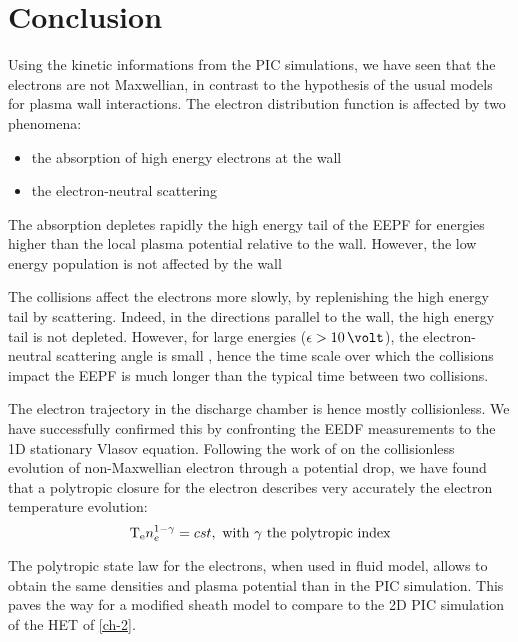 
\section{Conclusion }
\label{sec-ch3conclusion}

Using the kinetic informations from the \ac{PIC} simulations, we have seen that the electrons are not Maxwellian, in contrast to the hypothesis of the usual models for plasma wall interactions.
The electron distribution function is affected by two phenomena\string:
\begin{itemize}
  \item the absorption of high energy electrons at the wall
  \item the electron-neutral scattering
\end{itemize}
\vspace{1em}
The absorption depletes rapidly the high energy tail of the EEPF for energies higher than the local plasma potential relative to the wall.
However, the low energy population is not affected by the wall

The collisions affect the electrons more slowly, by replenishing the high energy tail by scattering.
Indeed, in the directions parallel to the wall, the high energy tail is not depleted.
However, for large energies ($\ek > 10\,\volt$), the electron-neutral scattering angle is small \citep{vahedi1995}, hence the time scale over which the collisions impact the EEPF is much longer than the typical time between two collisions.

The electron trajectory in the discharge chamber is hence mostly collisionless.
We have successfully confirmed this by confronting the EEDF measurements to the 1D stationary Vlasov equation.
Following the work of \citet{zhang2016} on the collisionless evolution of non-Maxwellian electron through a potential drop, we have found that a polytropic closure for the electron describes very accurately the electron temperature evolution\string:
\begin{equation*} \label{eq-polyp2}
  \mathrm{T_e} n_e^{1-\gamma} = cst, \text{ with $\gamma$ the polytropic index}
\end{equation*}

The polytropic state law for the electrons, when used in fluid model, allows to obtain the same densities and plasma potential than in the \ac{PIC} simulation.
This paves the way for a modified sheath model to compare to the \ac{2D} \ac{PIC} simulation of the \ac{HET} of \cref{ch-2}.

